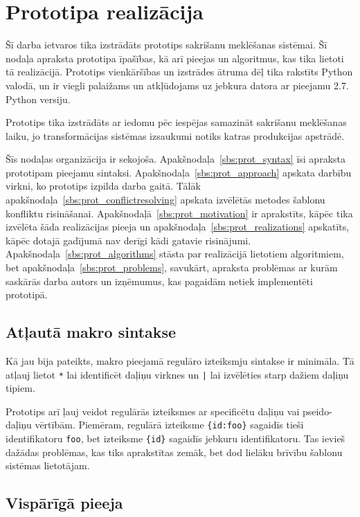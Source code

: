 \section{\label{s:prototype}Prototipa realizācija}

Šī darba ietvaros tika izstrādāts prototips sakrišanu meklēšanas sistēmai. Šī nodaļa apraksta prototipa īpašības, kā arī pieejas un algoritmus, kas tika lietoti tā realizācijā. Prototips vienkāršības un izstrādes ātruma dēļ tika rakstīts Python valodā, un ir viegli palaižams un atkļūdojams uz jebkura datora ar pieejamu 2.7. Python versiju.

Prototips tika izstrādāts ar iedomu pēc iespējas samazināt sakrišanu meklēšanas laiku, jo transformācijas sistēmas izsaukumi notiks katras produkcijas apstrādē.

Šīs nodaļas organizācija ir sekojoša. Apakšnodaļa~\ref{sbs:prot_syntax} īsi apraksta prototipam pieejamu sintaksi. Apakšnodaļa~\ref{sbs:prot_approach} apskata darbību virkni, ko prototips izpilda darba gaitā. Tālāk apakšnodaļa~\ref{sbs:prot_conflictresolving} apskata izvēlētās metodes šablonu konfliktu risināšanai. Apakšnodaļā~\ref{sbs:prot_motivation} ir aprakstīts, kāpēc tika izvēlēta šāda realizācijas pieeja un apakšnodaļa~\ref{sbs:prot_realizations} apskatīts, kāpēc dotajā gadījumā nav derīgi kādi gatavie risinājumi. Apakšnodaļa~\ref{sbs:prot_algorithms} stāsta par realizācijā lietotiem algoritmiem, bet apakšnodaļa~\ref{sbs:prot_problems}, savukārt, apraksta problēmas ar kurām saskārās darba autors un izņēmumus, kas pagaidām netiek implementēti prototipā.

\subsection{\label{sbs:prot_syntax}Atļautā makro sintakse}

Kā jau bija pateikts, makro pieejamā regulāro izteiksmju sintakse ir minimāla. Tā atļauj lietot \verb|*| lai identificēt daļiņu virknes un \verb/|/ lai izvēlēties starp dažiem daļiņu tipiem.

Prototips arī ļauj veidot regulārās izteiksmes ar specificētu daļiņu vai pseido-daļiņu vērtībām. Piemēram, regulārā izteiksme \verb|{id:foo}| sagaidīs tieši identifikatoru \verb|foo|, bet izteiksme \verb|{id}| sagaidīs jebkuru identifikatoru. Tas ievieš dažādas problēmas, kas tiks aprakstītas zemāk, bet dod lielāku brīvību šablonu sistēmas lietotājam.

\subsection{\label{sbs:prot_approach}Vispārīgā pieeja}

